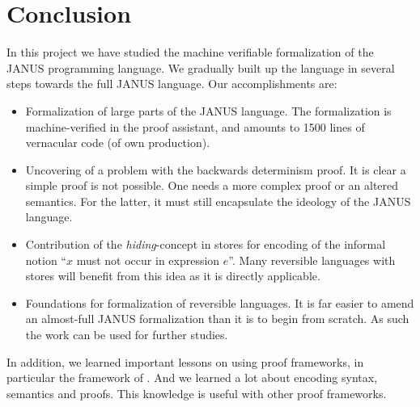 \chapter{Conclusion}


In this project we have studied the machine verifiable formalization
of the JANUS programming language. We gradually built up the language
in several steps towards the full JANUS language. Our accomplishments are:
\begin{itemize}
\item Formalization of large parts of the JANUS language. The
  formalization is machine-verified in the \coq{} proof assistant, and
  amounts to 1500 lines of vernacular code (of own production).
\item Uncovering of a problem with the backwards determinism proof. It
  is clear a simple proof is not possible. One needs a more complex
  proof or an altered semantics. For the latter, it must still
  encapsulate the ideology of the JANUS language.
\item Contribution of the \emph{hiding}-concept in stores for encoding
  of the informal notion ``$x$ must not occur in expression $e$''. Many
  reversible languages with stores will benefit from this idea as it
  is directly applicable.
\item Foundations for formalization of reversible languages. It is far
  easier to amend an almost-full JANUS formalization than it is to
  begin from scratch. As such the work can be used for further studies.
\end{itemize}

In addition, we learned important lessons on using proof frameworks,
in particular the framework of \coq{}. And we learned a lot about
encoding syntax, semantics and proofs. This knowledge is useful with
other proof frameworks.

